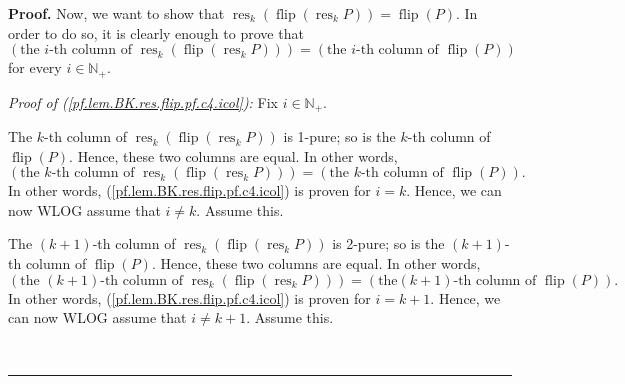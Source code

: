 \documentclass[numbers=enddot,12pt,final,onecolumn,notitlepage]{scrartcl}%
\theoremstyle{definition}
\newenvironment{proof}[1][Proof]{\noindent\textbf{#1.} }{\ \rule{0.5em}{0.5em}}
\begin{document}
\begin{proof}
Now, we want to show that $\operatorname*{res}\nolimits_{k}\left(
\operatorname*{flip}\left(  \operatorname*{res}\nolimits_{k}P\right)  \right)
=\operatorname*{flip}\left(  P\right)  $. In order to do so, it is clearly
enough to prove that%
\begin{equation}
\left(  \text{the }i\text{-th column of }\operatorname*{res}\nolimits_{k}%
\left(  \operatorname*{flip}\left(  \operatorname*{res}\nolimits_{k}P\right)
\right)  \right)  =\left(  \text{the }i\text{-th column of }%
\operatorname*{flip}\left(  P\right)  \right)
\label{pf.lem.BK.res.flip.pf.c4.icol}%
\end{equation}
for every $i\in\mathbb{N}_{+}$.

\textit{Proof of (\ref{pf.lem.BK.res.flip.pf.c4.icol}):} Fix $i\in
\mathbb{N}_{+}$.

The $k$-th column of $\operatorname*{res}\nolimits_{k}\left(
\operatorname*{flip}\left(  \operatorname*{res}\nolimits_{k}P\right)  \right)
$ is 1-pure; so is the $k$-th column of $\operatorname*{flip}\left(  P\right)
$. Hence, these two columns are equal. In other words,%
\[
\left(  \text{the }k\text{-th column of }\operatorname*{res}\nolimits_{k}%
\left(  \operatorname*{flip}\left(  \operatorname*{res}\nolimits_{k}P\right)
\right)  \right)  =\left(  \text{the }k\text{-th column of }%
\operatorname*{flip}\left(  P\right)  \right)  .
\]
In other words, (\ref{pf.lem.BK.res.flip.pf.c4.icol}) is proven for $i=k$.
Hence, we can now WLOG assume that $i\neq k$. Assume this.

The $\left(  k+1\right)  $-th column of $\operatorname*{res}\nolimits_{k}%
\left(  \operatorname*{flip}\left(  \operatorname*{res}\nolimits_{k}P\right)
\right)  $ is 2-pure; so is the $\left(  k+1\right)  $-th column of
$\operatorname*{flip}\left(  P\right)  $. Hence, these two columns are equal.
In other words,%
\[
\left(  \text{the }\left(  k+1\right)  \text{-th column of }%
\operatorname*{res}\nolimits_{k}\left(  \operatorname*{flip}\left(
\operatorname*{res}\nolimits_{k}P\right)  \right)  \right)  =\left(  \text{the
}\left(  k+1\right)  \text{-th column of }\operatorname*{flip}\left(
P\right)  \right)  .
\]
In other words, (\ref{pf.lem.BK.res.flip.pf.c4.icol}) is proven for $i=k+1$.
Hence, we can now WLOG assume that $i\neq k+1$. Assume this.


\end{proof}
\end{document}
